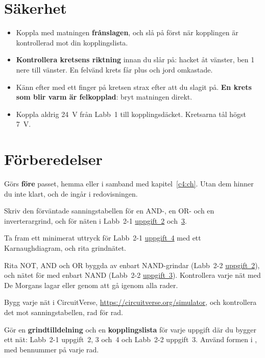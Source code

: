 \section{Säkerhet}
\label{lab2:sec:safety}
\begin{warning}
\begin{itemize}
  \item Koppla med matningen \textbf{frånslagen}, och slå på först när kopplingen är kontrollerad
    mot din kopplingslista.
  \item \textbf{Kontrollera kretsens riktning} innan du slår på: hacket åt vänster, ben 1 nere till
    vänster. En felvänd krets får plus och jord omkastade.
  \item Känn efter med ett finger på kretsen strax efter att du slagit på. \textbf{En krets som blir
    varm är felkopplad}: bryt matningen direkt.
  \item Koppla aldrig 24~V från Labb~1 till kopplingsdäcket. Kretsarna tål högst 7~V.
\end{itemize}
\end{warning}

\section{Förberedelser}
\label{lab2:sec:prep}
Görs \textbf{före} passet, hemma eller i samband med kapitel~\ref{c4:ch}. Utan dem hinner du inte
klart, och de ingår i redovisningen.

Skriv den förväntade sanningstabellen för en AND-, en OR-
och en inverterargrind, och för näten i Labb~2-1 \hyperref[lab2:1:u2]{uppgift~2}
och~\hyperref[lab2:1:u3]{3}.

Ta fram ett minimerat uttryck för Labb~2-1
\hyperref[lab2:1:u4]{uppgift~4} med ett Karnaughdiagram, och rita grindnätet.

Rita NOT, AND och OR byggda av enbart NAND-grindar (Labb~2-2
\hyperref[lab2:2:u2]{uppgift~2}), och nätet för  med enbart NAND (Labb~2-2
\hyperref[lab2:2:u3]{uppgift~3}). Kontrollera varje nät med De Morgans lagar eller genom att gå
igenom alla rader.

Bygg varje nät i CircuitVerse,
\url{https://circuitverse.org/simulator}, och kontrollera det mot sanningstabellen, rad för rad.

Gör en \textbf{grindtilldelning} och en \textbf{kopplingslista} för
varje uppgift där du bygger ett nät: Labb~2-1 uppgift~2, 3 och~4 och Labb~2-2 uppgift~3. Använd
formen i , med bennummer på varje rad.

